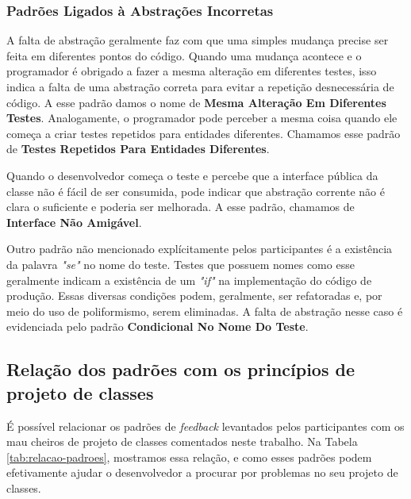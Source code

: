 \documentclass[conference]{IEEEtran}
\begin{document}
\subsubsection{Padrões Ligados à Abstrações Incorretas}

A falta de abstração geralmente faz com que uma simples mudança precise
ser feita em diferentes pontos do código. Quando uma mudança acontece e 
o programador é obrigado a fazer a mesma alteração em diferentes testes,
isso indica a falta de uma abstração correta para evitar a 
repetição desnecessária de código.
A esse padrão damos o nome de \textbf{Mesma Alteração Em Diferentes Testes}.
Analogamente, o programador pode perceber a mesma coisa
quando ele começa a criar testes repetidos para entidades diferentes.
Chamamos esse padrão de \textbf{Testes Repetidos Para Entidades Diferentes}.

Quando o desenvolvedor começa o teste e percebe que a interface pública da classe
não é fácil de ser consumida, pode indicar que abstração
corrente não é clara o suficiente e poderia ser melhorada. A esse padrão,
chamamos de \textbf{Interface Não Amigável}.

Outro padrão não mencionado explícitamente pelos participantes 
é a existência da palavra \textit{"se"} no nome do teste. Testes que
possuem nomes como esse geralmente indicam a existência de um \textit{"if"} na implementação
do código de produção. Essas diversas condições podem, geralmente, ser refatoradas e,
por meio do uso de poliformismo, serem eliminadas. A falta de abstração nesse caso
é evidenciada pelo padrão \textbf{Condicional No Nome Do Teste}.

\subsection{Relação dos padrões com os princípios de projeto de classes}

É possível relacionar os padrões de \textit{feedback} levantados pelos participantes
com os mau cheiros de projeto de classes comentados neste trabalho. 
Na Tabela \ref{tab:relacao-padroes},
mostramos essa relação, e como esses padrões podem efetivamente ajudar o desenvolvedor
a procurar por problemas no seu projeto de classes.
\end{document}

